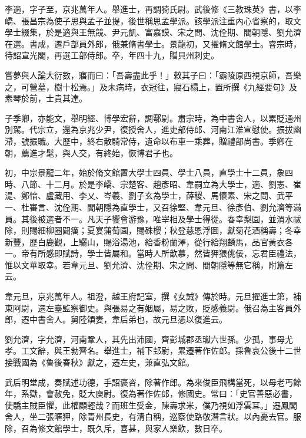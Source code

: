 
\begin{pinyinscope}

 李適，字子至，京兆萬年人。舉進士，再調猗氏尉。武後修《三教珠英》書，以李嶠、張昌宗為使子思與孟子並提，後世稱思孟學派。該學派注重內心省察的，取文學士綴集，於是適與王無競、尹元凱、富嘉謨、宋之問、沈佺期、閻朝隱、劉允濟在選。書成，遷戶部員外郎，俄兼脩書學士。景龍初，又擢脩文館學士。睿宗時，待詔宣光閣，再選工部侍郎。卒，年四十九，贈貝州刺史。



 嘗夢與人論大衍數，寤而曰：「吾壽盡此乎！」敕其子曰：「霸陵原西視京師，吾樂之，可營墓，樹十松焉。」及未病時，衣冠往，寢石榻上，置所撰《九經要句》及素琴於前，士貴其達。



 子季卿，亦能文，舉明經、博學宏辭，調鄠尉。肅宗時，為中書舍人，以累貶通州別駕。代宗立，還為京兆少尹，復授舍人，進吏部侍郎、河南江淮宣慰使。振拔幽滯，號振職。大歷中，終右散騎常侍，遺命以布車一乘葬，贈禮部尚書。季卿在朝，薦進才髦，與人交，有終始，恢博君子也。



 初，中宗景龍二年，始於脩文館置大學士四員、學士八員，直學士十二員，象四時、八節、十二月。於是李嶠、宗楚客、趙彥昭、韋嗣立為大學士，適、劉憲、崔湜、鄭愔、盧藏用、李乂、岑羲、劉子玄為學士，薛稷、馬懷素、宋之問、武平一、杜審言、沈佺期、閻朝隱為直學士，又召徐堅、韋元旦、徐彥伯、劉允濟等滿員。其後被選者不一。凡天子饗會游豫，唯宰相及學士得從。春幸梨園，並渭水祓除，則賜細柳圈闢癘；夏宴蒲萄園，賜硃櫻；秋登慈恩浮圖，獻菊花酒稱壽；冬幸新豐，歷白鹿觀，上驪山，賜浴湯池，給香粉蘭澤，從行給翔麟馬，品官黃衣各一。帝有所感即賦詩，學士皆屬和。當時人所歆慕，然皆狎猥佻佞，忘君臣禮法，惟以文華取幸。若韋元旦、劉允濟、沈佺期、宋之問、閻朝隱等無它稱，附篇左云。



 韋元旦，京兆萬年人。祖澄，越王府記室，撰《女誡》傳於時。元旦擢進士第，補東阿尉，遷左臺監察御史。與張易之有姻屬，易之敗，貶感義尉。俄召為主客員外郎，遷中書舍人。舅陸頌妻，韋后弟也，故元旦憑以復進云。



 劉允濟，字允濟，河南鞏人，其先出沛國，齊彭城郡丞瓛六世孫。少孤，事母尤孝。工文辭，與王勃齊名。舉進士，補下邽尉，累遷著作佐郎。採魯哀公後十二世接戰國為《魯後春秋》獻之，遷左史，兼直弘文館。



 武后明堂成，奏賦述功德，手詔褒咨，除著作郎。為來俊臣飛構當死，以母老丐餘年，系獄，會赦免，貶大庾尉。復為著作佐郎，修國史。常曰：「史官善惡必書，使驕主賊臣懼，此權顧輕哉？而班生受金，陳壽求米，僕乃視如浮雲耳。」遷鳳閣舍人，坐二張暱狎，除青州長史，有清白稱，巡察使路敬潛言狀。以內憂去官。服除，召為修文館學士，既久斥，喜甚，與家人樂飲，數日卒。




\end{pinyinscope}

